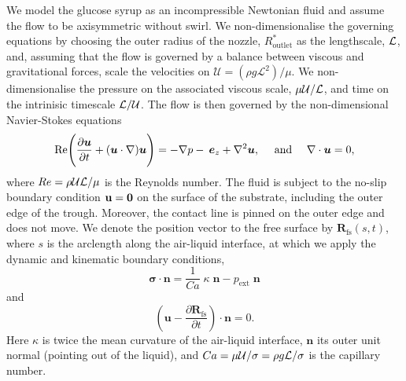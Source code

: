 \documentclass[aip,graphicx]{revtex4-1}
\newcommand{\sym}[1]{\text{#1}} \newcommand{\dif}{\mathrm{d}}
\newcommand{\vect}[1]{\bm{#1}}
\begin{document}
We model the glucose syrup as an incompressible Newtonian fluid
and assume the flow to be axisymmetric without swirl. 
We non-dimensionalise the governing equations by choosing 
the outer radius of the nozzle, $R_{\sym{outlet}}^*$ as the
lengthscale, ${\cal L}$, and, assuming that the flow is governed by a 
balance between viscous and gravitational forces, scale the velocities on
$\mathcal{U}=(\rho g \mathcal{L}^2) / \mu$. We non-dimensionalise the 
pressure on the associated viscous scale, $\mu {\cal U}/{\cal L}$,
and time on the intrinisic timescale ${\cal L}/{\cal U}$.
The flow is then governed by the non-dimensional Navier-Stokes equations
\begin{equation}
 \sym{Re} \Bigg( \pder[\vect{u}]{t} + (\vect{u} \cdot \nabla)
 \vect{u} \Bigg) = - \nabla p - \: \vect{e}_z
 + \nabla^2 \vect{u},
\mbox{ \ \ \ and \ \  \ }
 \nabla \cdot \vect{u} = 0,
 \label{eqn:ns}
\end{equation}
where $Re=\rho {\cal U} {\cal L}/\mu$ is the Reynolds number.
The fluid is subject to the no-slip boundary condition ${\bf u} = {\bf 0}$
on the surface of the substrate, including the outer edge of the
trough. Moreover, the contact line is pinned on the outer edge and
does not move. 
We denote the position vector
to the free surface by $\vect{R}_{\sym{fs}}(s,t)$, where $s$ is
the arclength along the air-liquid interface, at which we
apply the dynamic and kinematic boundary conditions,
\begin{equation}
\vect{\sigma} \cdot \vect{n} = \frac{1}{Ca} \; \kappa \; \vect{n}
-p_{\sym{ext}} \; \vect{n}
\end{equation}
and
\begin{equation}
\left( \vect{u} - \frac{\partial \vect{R}_{\sym{fs}}}{\partial t} \right)
\cdot \vect{n} = 0.
\end{equation}
Here $\kappa$ is twice the mean curvature of the air-liquid interface, 
$\vect{n}$ its outer unit normal (pointing out of the liquid), 
and $Ca=\mu {\cal U}/\sigma=\rho g {\cal L}/\sigma$ is the capillary
number.
\end{document}
